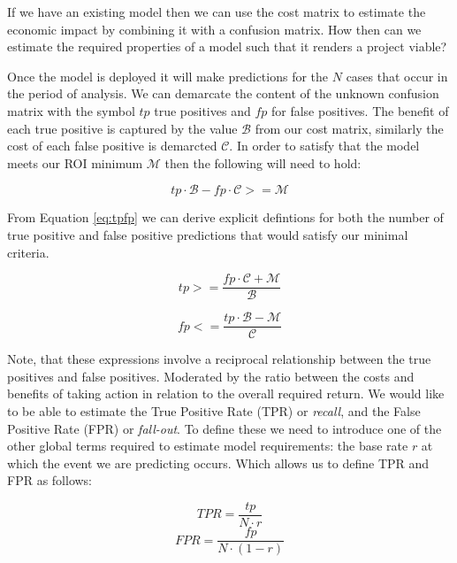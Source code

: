 \documentclass[11pt,a4paper]{article}
\begin{document}
If we have an existing model then we can use the cost matrix to estimate the economic
impact by combining it with a confusion matrix. How then can we estimate the required properties of
a model such that it renders a project viable?

Once the model is deployed it will make predictions for the $N$ cases that occur in the period of analysis.
We can demarcate the content of the unknown confusion matrix with
the symbol $tp$ true positives and $fp$ for false positives.
The benefit of each true positive is captured
by the value $\mathcal{B}$ from our cost matrix, similarly the cost of each false positive is
demarcted $\mathcal{C}$.
In order to satisfy that the model meets our ROI minimum $\mathcal{M}$ then the following
will need to hold:

\begin{equation}
\label{eq:tpfp}
tp \cdot \mathcal{B} - fp \cdot \mathcal{C} >= \mathcal{M}
\end{equation}

From Equation \ref{eq:tpfp} we can derive explicit defintions for both the number of true positive and false
positive predictions that would satisfy our minimal criteria.

\begin{equation}
tp >= \frac{fp \cdot \mathcal{C} + \mathcal{M}}{\mathcal{B}}
\end{equation}

\begin{equation}
fp <= \frac{tp \cdot \mathcal{B} - \mathcal{M}}{\mathcal{C}}
\end{equation}


Note, that these expressions involve a reciprocal relationship between the true positives and false positives.
Moderated by the ratio between the costs and benefits of taking action in relation to the overall required return.
We would like to be able to estimate the True Positive Rate (TPR) or \textit{recall},
and the False Positive Rate (FPR) or \textit{fall-out}.
To define these we need to introduce one of the other global terms required to estimate
model requirements: the base rate $r$ at which the event we are predicting occurs.
Which allows us to define TPR and FPR as follows:

\begin{equation}
TPR = \frac{ tp }{ N \cdot r }
\end{equation}
\begin{equation}
FPR = \frac{ fp }{ N \cdot (1-r) }
\end{equation}
\end{document}
